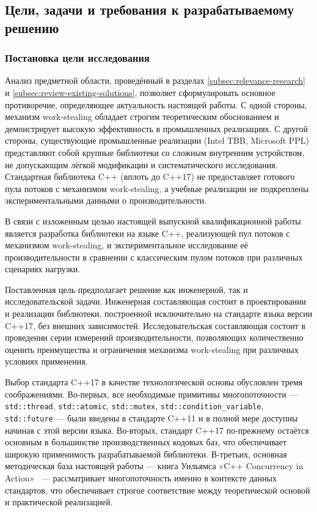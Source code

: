 \subsection{Цели, задачи и требования к разрабатываемому решению}

\subsubsection{Постановка цели исследования}

Анализ предметной области, проведённый в разделах \ref{subsec:relevance-research} и \ref{subsec:review-existing-solutions},
позволяет сформулировать основное противоречие, определяющее
актуальность настоящей работы. С одной стороны, механизм work-stealing
обладает строгим теоретическим обоснованием и демонстрирует высокую
эффективность в промышленных реализациях. С другой стороны,
существующие промышленные реализации (Intel TBB, Microsoft PPL)
представляют собой крупные библиотеки со сложным внутренним
устройством, не допускающим лёгкой модификации и систематического
исследования. Стандартная библиотека C++ (вплоть до C++17) не
предоставляет готового пула потоков с механизмом work-stealing,
а учебные реализации не подкреплены экспериментальными данными
о производительности.

В связи с изложенным целью настоящей выпускной квалификационной
работы является разработка библиотеки на языке C++, реализующей
пул потоков с механизмом work-stealing, и экспериментальное
исследование её производительности в сравнении с классическим
пулом потоков при различных сценариях нагрузки.

Поставленная цель предполагает решение как инженерной, так и
исследовательской задачи. Инженерная составляющая состоит в
проектировании и реализации библиотеки, построенной исключительно
на стандарте языка версии C++17, без внешних
зависимостей. Исследовательская составляющая состоит в проведении
серии измерений производительности, позволяющих количественно
оценить преимущества и ограничения механизма work-stealing при
различных условиях применения.

Выбор стандарта C++17 в качестве технологической основы
обусловлен тремя соображениями. Во-первых, все необходимые примитивы
многопоточности --- \texttt{std::thread}, \texttt{std::atomic},
\texttt{std::mutex}, \texttt{std::condition\_variable},
\texttt{std::future} --- были введены в стандарте C++11 и в полной
мере доступны начиная с этой версии языка. Во-вторых, стандарт
C++17 по-прежнему остаётся основным в большинстве
производственных кодовых баз, что обеспечивает широкую применимость
разрабатываемой библиотеки. В-третьих, основная методическая база
настоящей работы --- книга Уильямса «C++ Concurrency in
Action»~\cite{Williams2019} --- рассматривает многопоточность
именно в контексте данных стандартов, что обеспечивает строгое
соответствие между теоретической основой и практической реализацией.

